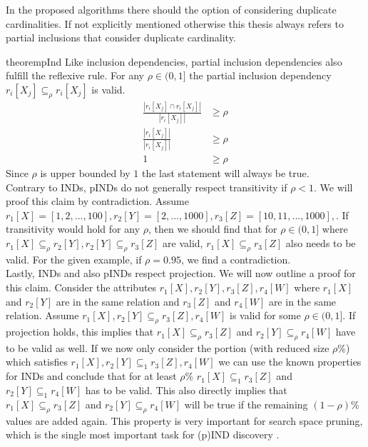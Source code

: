 \noindent In the proposed algorithms there should the option of considering duplicate cardinalities. If not explicitly mentioned otherwise this thesis always refers to partial inclusions that consider duplicate cardinality.

\begin{restatable}{theorem}{pInd}\label{theo:pInd}
    Like inclusion dependencies, partial inclusion dependencies also fulfill the reflexive rule. For any $\rho \in (0, 1]$ the partial inclusion dependency $r_i[X_j] \subseteq_{\rho} r_i[X_j]$ is valid.
    \begin{align*}
        \frac{|r_i[X_j] \cap r_i[X_j]|}
            {|r_i[X_j]|} & \geq \rho \\
        \frac{|r_i[X_j]|}
            {|r_i[X_j]|} & \geq \rho \\
            1 & \geq \rho
     \end{align*}
     Since $\rho$ is upper bounded by $1$ the last statement will always be true. \\

     \noindent Contrary to INDs, pINDs do not generally respect transitivity if $\rho < 1$. We will proof this claim by contradiction. Assume $r_1[X] = [1, 2, ..., 100], r_2[Y] = [2, ..., 1000], r_3[Z] = [10, 11, ..., 1000],$. If transitivity would hold for any $\rho$, then we should find that for $\rho \in (0, 1]$ where $r_1[X] \subseteq_\rho r_2[Y], r_2[Y] \subseteq_\rho  r_3[Z]$ are valid, $ r_1[X] \subseteq_\rho  r_3[Z]$ also needs to be valid. For the given example, if $\rho = 0.95$, we find a contradiction. \\

     \noindent Lastly, INDs and also pINDs respect projection. We will now outline a proof for this claim. Consider the attributes $r_1[X], r_2[Y], r_3[Z], r_4[W]$ where $r_1[X]$ and $r_2[Y]$ are in the same relation and $r_3[Z]$ and $r_4[W]$ are in the same relation. Assume $r_1[X], r_2[Y] \subseteq_\rho r_3[Z], r_4[W]$ is valid for some $\rho \in (0, 1]$. If projection holds, this implies that $r_1[X] \subseteq_\rho r_3[Z]$ and $r_2[Y] \subseteq_\rho r_4[W]$ have to be valid as well. If we now only consider the portion (with reduced size $\rho\%$) which satisfies $r_1[X], r_2[Y] \subseteq_1 r_3[Z], r_4[W]$ we can use the known properties for INDs and conclude that for at least $\rho\%$ $r_1[X] \subseteq_1 r_3[Z]$ and $r_2[Y] \subseteq_1 r_4[W]$ has to be valid. This also directly implies that $r_1[X] \subseteq_\rho r_3[Z]$ and $r_2[Y] \subseteq_\rho r_4[W]$ will be true if the remaining $(1-\rho)\%$ values are added again. This property is very important for search space pruning, which is the single most important task for (p)IND discovery \cite{liu2010discover}.
\end{restatable}

